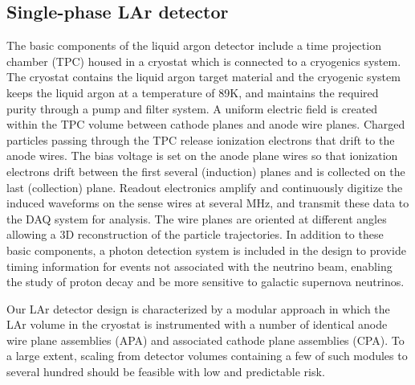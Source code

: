 \subsection{Single-phase LAr detector}


The basic components of the liquid argon detector include a time projection chamber (TPC) housed in a cryostat which is connected to  
a cryogenics system. 
%
The cryostat contains the liquid argon target material and the cryogenic system keeps the liquid argon at a temperature of 89K, and maintains the required purity through a pump and filter system. A uniform electric field is created within the TPC volume between cathode planes and anode wire planes. Charged particles passing through the TPC release ionization electrons that drift to the anode wires. The bias voltage is set on the anode plane wires so that ionization electrons drift between the first several (induction) planes and is collected on the last (collection) plane. Readout electronics amplify and continuously digitize the induced waveforms on the sense wires at several MHz, and transmit these data to the DAQ system for analysis. The wire planes are oriented at different angles allowing a 3D reconstruction of the particle trajectories. In addition to these basic components, a photon detection system
is included in the design to provide timing information for events not associated with the neutrino beam, enabling the study of proton decay and be more sensitive to galactic supernova neutrinos.

Our LAr detector design is characterized by a modular approach in which the LAr volume in the cryostat is instrumented with a number of identical anode wire plane assemblies (APA) and associated cathode plane assemblies (CPA). To a large extent, scaling from detector volumes containing a few of such modules  to several hundred should be feasible with low and predictable risk.\\









%






